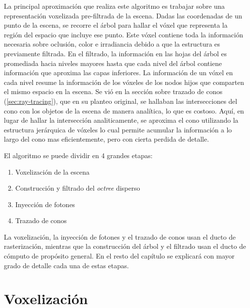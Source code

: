 La principal aproximación que realiza este algoritmo es trabajar sobre una representación voxelizada pre-filtrada de la escena.
Dadas las coordenadas de un punto de la escena, se recorre el árbol para hallar el vóxel que representa la región del espacio que incluye ese punto.
Este vóxel contiene toda la información necesaria sobre oclusión, color e irradiancia debido a que la estructura es previamente filtrada.
En el filtrado, la información en las hojas del árbol es promediada hacia niveles mayores hasta que cada nivel del árbol contiene información que aproxima las capas inferiores.
La información de un vóxel en cada nivel resume la información de los vóxeles de los nodos hijos que comparten el mismo espacio en la escena.
Se vió en la sección sobre trazado de conos (\ref{sec:ray-tracing}), que en su planteo original, se hallaban las intersecciones del cono con los objetos de la escena de manera analítica, lo que es costoso.
Aquí, en lugar de hallar la intersección analiticamente, se aproxima el cono utilizando la estructura jerárquica de vóxeles lo cual permite acumular la información a lo largo del cono mas eficientemente, pero con cierta perdida de detalle.


El algoritmo se puede dividir en 4 grandes etapas:

\begin{enumerate}
    \item Voxelización de la escena
    \item Construcción y filtrado del \textit{octree} disperso
    \item Inyección de fotones
    \item Trazado de conos
\end{enumerate}

La voxelización, la inyección de fotones y el trazado de conos usan el ducto de rasterización, mientras que la construcción del árbol y el filtrado usan el ducto de cómputo de propósito general.
En el resto del capítulo se explicará con mayor grado de detalle cada una de estas etapas.

\section{Voxelización}\label{sec:voxelization}

